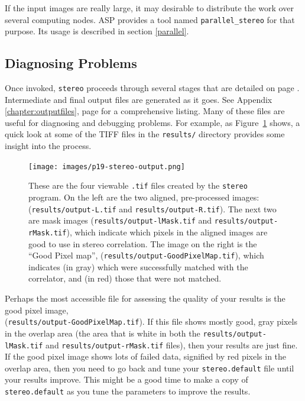 If the input images are really large, it may desirable to distribute the
work over several computing nodes. ASP provides a tool named
\texttt{parallel\_stereo} for that purpose. Its usage is described in section
\ref{parallel}.

\subsection{Diagnosing Problems}

Once invoked, \texttt{stereo} proceeds through several stages that are
detailed on page \pageref{entrypoints}.  Intermediate and final output
files are generated as it goes.  See Appendix
\ref{chapter:outputfiles}, page \pageref{chapter:outputfiles} for a
comprehensive listing.  Many of these files are useful for diagnosing and
debugging problems.  For example, as Figure~\ref{p19-stereo-output}
shows, a quick look at some of the TIFF files in the \texttt{results/}
directory provides some insight into the process.

\begin{figure}[t!]
\begin{minipage}{4in}
\texttt{[image: images/p19-stereo-output.png]}
\end{minipage}
\hfill
\begin{minipage}{2.9in}
\caption[P19 stereo output images]{
    \label{p19-stereo-output}
        These are the four viewable \texttt{.tif} files created by the
        \texttt{stereo} program.  On the left are the two aligned,
        pre-processed images: (\texttt{results/output-L.tif} and
        \texttt{results/output-R.tif}).  The next two are mask images
        (\texttt{results/output-lMask.tif} and
        \texttt{results/output-rMask.tif}), which indicate which
        pixels in the aligned images are good to use in stereo
        correlation.  The image on the right is the ``Good Pixel
        map'', (\texttt{results/output-GoodPixelMap.tif}), which
        indicates (in gray) which were successfully matched with the
        correlator, and (in red) those that were not matched.}
\end{minipage}
\end{figure}

Perhaps the most accessible file for assessing the quality of your
results is the good pixel image,
\\ (\texttt{results/output-GoodPixelMap.tif}).  If this file shows
mostly good, gray pixels in the overlap area (the area that is white
in both the \texttt{results/output-lMask.tif} and
\texttt{results/output-rMask.tif} files), then your results are
just fine.  If the good pixel image shows lots of failed data,
signified by red pixels in the overlap area, then you need to go back
and tune your \texttt{stereo.default} file until your results improve.
This might be a good time to make a copy of \texttt{stereo.default} as
you tune the parameters to improve the results.

